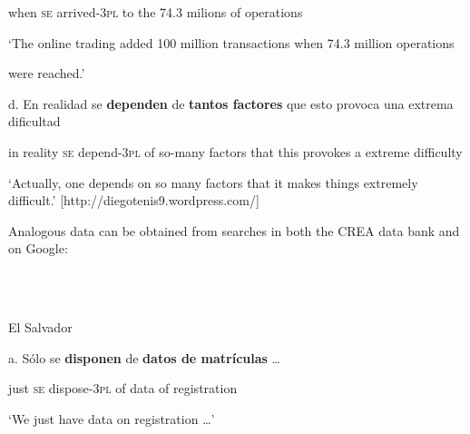 \documentclass[output=paper]{langsci/langscibook}
\begin{document}
           when    \textsc{se}   arrived{}-\textsc{3pl}  to the 74.3 milions    of operations

      ‘The online trading added 100 million transactions when 74.3 million operations 

      were reached.’ 

\begin{styleBodyTextIndentii}
\end{styleBodyTextIndentii}

d.   En realidad se  \textbf{dependen} de  \textbf{tantos factores}  que  esto provoca  una extrema  dificultad

     in   reality   \textsc{se}   depend{}-\textsc{3pl} of   so-many    factors  that this provokes a    extreme  difficulty

\begin{styleBodyTextIndentiii}
‘Actually, one depends on so many factors that it makes things extremely difficult.’ [http://diegotenis9.wordpress.com/]
\end{styleBodyTextIndentiii}

\begin{styleBodyTextIndentii}
Analogous data can be obtained from searches in both the CREA data bank and on Google:
\end{styleBodyTextIndentii}

\begin{styleBodyTextIndentii}
\ea%
    \label{ex:key:28}
    \gll\\
        \\
    \glt
    \z

          El Salvador
\end{styleBodyTextIndentii}

\begin{styleBodyTextIndentii}
a.   Sólo se  \textbf{disponen}     de  \textbf{datos de  matrículas} …     
\end{styleBodyTextIndentii}

\begin{styleBodyTextIndentii}
       just  \textsc{se}   dispose{}-\textsc{3pl} of  data    of  registration
\end{styleBodyTextIndentii}

\begin{styleBodyTextIndentii}
        ‘We just have data on registration …’
\end{styleBodyTextIndentii}
\end{document}
